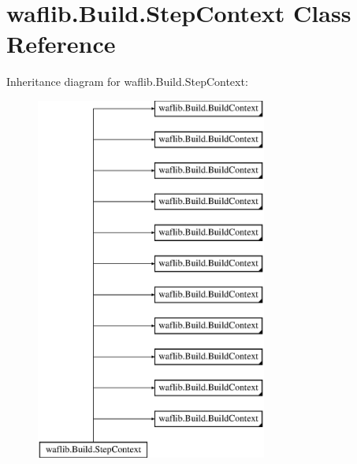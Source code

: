 \hypertarget{classwaflib_1_1_build_1_1_step_context}{}\section{waflib.\+Build.\+Step\+Context Class Reference}
\label{classwaflib_1_1_build_1_1_step_context}
Inheritance diagram for waflib.\+Build.\+Step\+Context\+:\begin{figure}[H]
\begin{center}
\leavevmode
\includegraphics[height=12.000000cm]{classwaflib_1_1_build_1_1_step_context}
\end{center}
\end{figure}
